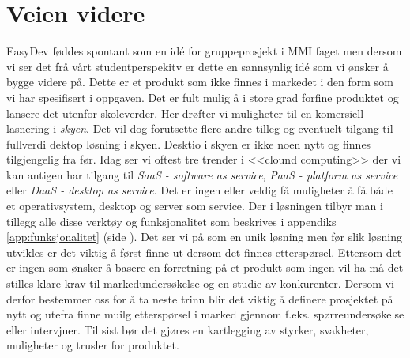 \section{Veien videre}
EasyDev føddes spontant som en idé for gruppeprosjekt i MMI faget men dersom vi ser det frå vårt studentperspekitv er dette en sannsynlig idé som vi ønsker å bygge videre på. Dette er et produkt som ikke finnes i markedet i den form som vi har spesifisert i oppgaven. Det er fult mulig å i store grad forfine produktet og lansere det utenfor skoleverder. Her drøfter vi muligheter til en komersiell lasnering i \textit{skyen}. Det vil dog forutsette flere andre tilleg og eventuelt tilgang til fullverdi dektop løsning i skyen. Desktio i skyen er ikke noen nytt og finnes tilgjengelig fra før. Idag ser vi oftest tre trender i <<clound computing>> der vi kan antigen har tilgang til \textit{SaaS - software as service}, \textit{PaaS - platform as service} eller \textit{DaaS - desktop as service}. Det er ingen eller veldig få muligheter å få både et operativsystem, desktop og server som service. Der i løsningen tilbyr man i tillegg alle disse verktøy og funksjonalitet som beskrives i appendiks \ref{app:funksjonalitet} (side \pageref{app:funksjonalitet}). Det ser vi på som en unik løsning men før slik løsning utvikles er det viktig å først finne ut dersom det finnes etterspørsel. Ettersom det er ingen som ønsker å basere en forretning på et produkt som ingen vil ha må det stilles klare krav til markedundersøkelse og en studie av konkurenter. Dersom vi derfor bestemmer oss for å ta neste trinn blir det viktig å definere prosjektet på nytt og utefra finne muilg etterspørsel i marked gjennom f.eks. spørreundersøkelse eller intervjuer. Til sist bør det gjøres en kartlegging av styrker, svakheter, muligheter og trusler for produktet. 

